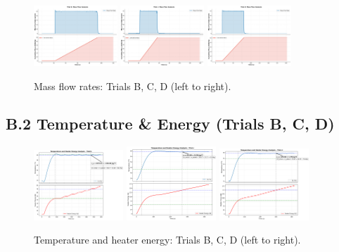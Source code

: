 \documentclass[12pt]{article}
\begin{document}
\begin{figure}[H]
\centering
\includegraphics[width=0.28\textwidth]{graphs/part1_trial_b_mass_flow.png}\hfill
\includegraphics[width=0.28\textwidth]{graphs/part1_trial_c_mass_flow.png}\hfill
\includegraphics[width=0.28\textwidth]{graphs/part1_trial_d_mass_flow.png}
\caption{Mass flow rates: Trials B, C, D (left to right).}
\label{fig:app_mass_flow}
\end{figure}

\subsection*{B.2 Temperature \& Energy (Trials B, C, D)}

\begin{figure}[H]
\centering
\includegraphics[width=0.30\textwidth]{graphs/part2_trial_b_temp_heater_energy.png}\hfill
\includegraphics[width=0.30\textwidth]{graphs/part2_trial_c_temp_heater_energy.png}\hfill
\includegraphics[width=0.30\textwidth]{graphs/part2_trial_d_temp_heater_energy.png}
\caption{Temperature and heater energy: Trials B, C, D (left to right).}
\label{fig:app_temp_energy}
\end{figure}
\end{document}
